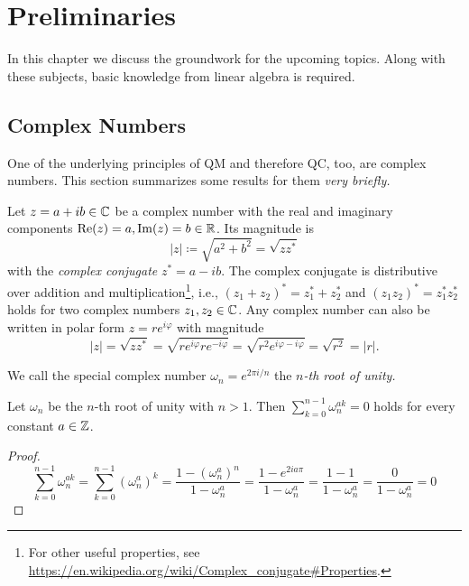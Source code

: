 \chapter{Preliminaries}
	In this chapter we discuss the groundwork for the upcoming topics. Along with these subjects, basic knowledge from linear algebra is required.

	\section{Complex Numbers}
		One of the underlying principles of \ac{QM} and therefore \ac{QC}, too, are complex numbers. This section summarizes some results for them \emph{very briefly.}

		Let \( z = a + ib \in \mathbb{C} \) be a complex number with the real and imaginary components \( \Re(z) = a, \Im(z) = b \in \mathbb{R} \). Its magnitude is
		\begin{equation}
			\lvert z \rvert \coloneqq \sqrt{a^2 + b^2} = \sqrt{z z^\ast}
		\end{equation}
		with the \emph{complex conjugate} \( z^\ast = a - ib \). The complex conjugate is distributive over addition and multiplication\footnote{For other useful properties, see \url{https://en.wikipedia.org/wiki/Complex_conjugate\#Properties}.}, i.e., \( (z_1 + z_2)^\ast = z_1^\ast + z_2^\ast \) and \( (z_1 z_2)^\ast = z_1^\ast z_2^\ast \) holds for two complex numbers \( z_1, z_2 \in \mathbb{C} \). Any complex number can also be written in polar form \( z = r e^{i \varphi} \) with magnitude
		\begin{equation}
			\lvert z \rvert = \sqrt{z z^\ast} = \sqrt{r e^{i \varphi} r e^{-i \varphi}} = \sqrt{r^2 e^{i \varphi - i \varphi}} = \sqrt{r^2} = \lvert r \rvert.
		\end{equation}
		\begin{definition}
			We call the special complex number \( \omega_n = e^{2 \pi i / n} \) the \emph{\(n\)-th root of unity.}
		\end{definition}
		\begin{theorem}  \label{th:rootsOfUnity}
			Let \( \omega_n \) be the \(n\)-th root of unity with \( n > 1 \). Then \( \sum_{k = 0}^{n - 1} \omega_n^{ak} = 0 \) holds for every constant \(a \in \mathbb{Z}\).
		\end{theorem}
		\begin{proof}
			\begin{equation}
				\sum_{k = 0}^{n - 1} \omega_n^{ak}
				= \sum_{k = 0}^{n - 1} (\omega_n^a)^k
				= \frac{1 - (\omega_n^a)^n}{1 - \omega_n^a}
				= \frac{1 - e^{2 i a \pi}}{1 - \omega_n^a}
				= \frac{1 - 1}{1 - \omega_n^a}
				= \frac{0}{1 - \omega_n^a}
				= 0
			\end{equation}
		\end{proof}


